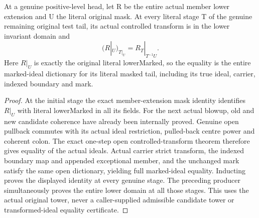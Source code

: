 \begin{theorem}
\label{hir:member-tail-actual-mask-transform-identity}
\leanok
At a genuine positive-level head, let R be the entire actual member lower
extension and U the literal original mask. At every literal stage T of the
genuine remaining original test tail, its actual controlled transform is in
the lower invariant domain and
\[
 (R|_U)_{T|_U}=R_T|_{T^{-1}U}.
\]
Here $R|_U$ is exactly the original literal lowerMarked, so the equality is the
entire marked-ideal dictionary for its literal masked tail, including its true
ideal, carrier, indexed boundary and mark.
\end{theorem}
\begin{proof}
At the initial stage the exact member-extension mask identity identifies $R|_U$
with literal lowerMarked in all its fields. For the next actual blowup, old
and new candidate coherence have already been internally proved. Genuine open
pullback commutes with its actual ideal restriction, pulled-back centre power
and coherent colon. The exact one-step open controlled-transform theorem
therefore gives equality of the actual ideals. Actual carrier strict transform,
the indexed boundary map and appended exceptional member, and the unchanged
mark satisfy the same open dictionary, yielding full marked-ideal equality.
Inducting proves the displayed identity at every genuine stage. The preceding
producer simultaneously proves the entire lower domain at all those stages.
This uses the actual original tower, never a caller-supplied admissible
candidate tower or transformed-ideal equality certificate.
\end{proof}

